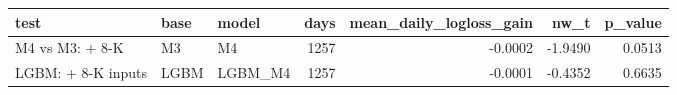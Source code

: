 \begin{tabular}{lllrrrr}
\toprule
test & base & model & days & mean\_daily\_logloss\_gain & nw\_t & p\_value \\
\midrule
M4 vs M3: + 8-K & M3 & M4 & 1257 & -0.0002 & -1.9490 & 0.0513 \\
LGBM: + 8-K inputs & LGBM & LGBM\_M4 & 1257 & -0.0001 & -0.4352 & 0.6635 \\
\bottomrule
\end{tabular}
